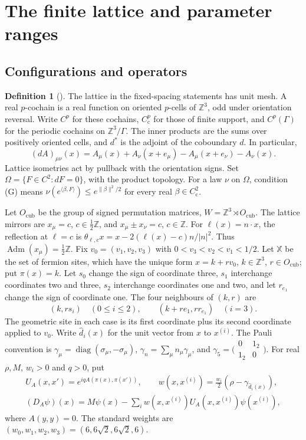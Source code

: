 \documentclass[11pt,letterpaper,reqno]{amsart}
\theoremstyle{definition}
\newtheorem{qcmdefinition}[qcmproposition]{Definition}
\newenvironment{definition}[1][]{\pushQED{\qed}\renewcommand{\qedsymbol}{$\blacksquare$}\begin{qcmdefinition}[#1]}{\popQED\end{qcmdefinition}}
\begin{document}
\section{The finite lattice and parameter ranges}
\label{app:qcm-lattice}

\subsection{Configurations and operators}
\begin{definition}\label{qcm:lattice-setting}
The lattice in the fixed-spacing statements has unit mesh. A real
$p$-cochain is a real function on oriented $p$-cells of $\mathbb Z^3$,
odd under orientation reversal. Write $C^p$ for these cochains,
$C^p_{\mathrm c}$ for those of finite support, and $C^p(\Gamma)$ for
the periodic cochains on $\mathbb Z^3/\Gamma$. The inner products
are the sums over positively oriented cells, and $d^*$ is the adjoint
of the coboundary $d$. In particular,
\[
 (dA)_{\mu\nu}(x)=A_\mu(x)+A_\nu(x+e_\mu)
                         -A_\mu(x+e_\nu)-A_\nu(x).
\]
Lattice isometries act by pullback with the orientation signs. Set
$\Omega=\{F\in C^2:dF=0\}$, with the product topology. For a law
$\nu$ on $\Omega$, condition (G) means
$\nu(e^{\langle\beta,F\rangle})\le e^{\|\beta\|^2/2}$ for every
real $\beta\in C^2_{\mathrm c}$.

Let $O_{\mathrm{cub}}$ be the group of signed permutation matrices,
$W=\mathbb Z^3\rtimes O_{\mathrm{cub}}$. The lattice mirrors are
$x_\mu=c$, $c\in\frac12\mathbb Z$, and
$x_\mu\pm x_\nu=c$, $c\in\mathbb Z$. For $\ell(x)=n\cdot x$,
the reflection at $\ell=c$ is
$\theta_{\ell,c}x=x-2(\ell(x)-c)n/|n|^2$. Thus
$\operatorname{Adm}(x_\mu)=\frac12\mathbb Z$. Fix
$v_0=(v_1,v_2,v_3)$ with $0<v_3<v_2<v_1<1/2$. Let $\mathbb X$ be the set of fermion sites, which have the unique form
$x=k+rv_0$, $k\in\mathbb Z^3$, $r\in O_{\mathrm{cub}}$; put
$\pi(x)=k$. Let $s_0$ change the sign of coordinate three,
$s_1$ interchange coordinates two and three, $s_2$ interchange
coordinates one and two, and let $r_{e_1}$ change the sign of
coordinate one. The four neighbours of $(k,r)$ are
\[
 (k,rs_i)\quad(0\le i\le2),\qquad (k+re_1,rr_{e_1})\quad(i=3).
\]
The geometric site in each case is its first coordinate plus its
second coordinate applied to $v_0$. Write $\widehat d_i(x)$ for
the unit vector from $x$ to $x^{(i)}$. The Pauli convention is
$\gamma_\mu=\operatorname{diag}(\sigma_\mu,-\sigma_\mu)$,
$\gamma_n=\sum_\mu n_\mu\gamma_\mu$, and
$\gamma_5=\bigl(\begin{smallmatrix}0&1_2\\1_2&0\end{smallmatrix}\bigr)$.
For real $\rho,M$, $w_i>0$ and $q>0$, put
\begin{gather*}
 U_A(x,x')=e^{iqA(\pi(x),\pi(x'))},\qquad
 w(x,x^{(i)})=\frac{w_i}{2}(\rho-\gamma_{\widehat d_i(x)}),\\
 (D_A\psi)(x)=M\psi(x)-\sum_iw(x,x^{(i)})U_A(x,x^{(i)})\psi(x^{(i)}),
\end{gather*}
where $A(y,y)=0$. The standard weights are
$(w_0,w_1,w_2,w_3)=(6,6\sqrt2,6\sqrt2,6)$.


\end{definition}
\end{document}

